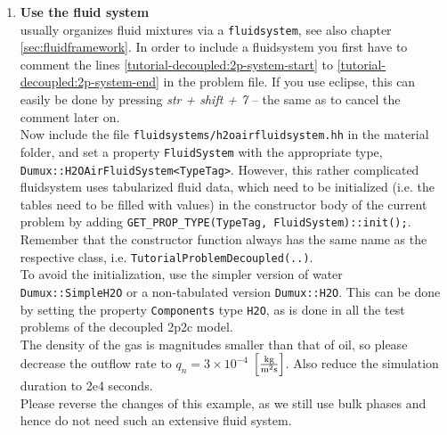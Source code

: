 \begin{enumerate}
\item \textbf{Use the \Dumux fluid system}\label{dec-ex1-fluidsystem} \\
\Dumux usually organizes fluid mixtures via a \texttt{fluidsystem}, see also chapter \ref{sec:fluidframework}. In order to include a fluidsystem you first have to comment the lines \ref{tutorial-decoupled:2p-system-start} to \ref{tutorial-decoupled:2p-system-end} in the problem file. If you use eclipse, this can easily be done by pressing \textit{str + shift + 7} -- the same as to cancel the comment later on.\\
Now include the file \texttt{fluidsystems/h2oairfluidsystem.hh} in the material folder, and set a property \texttt{FluidSystem} with the appropriate type, \texttt{Dumux::H2OAirFluidSystem<TypeTag>}. However, this rather complicated fluidsystem uses tabularized fluid data, which need to be initialized (i.e. the tables need to be filled with values) in the constructor body of the current problem by adding \texttt{GET\_PROP\_TYPE(TypeTag, FluidSystem)::init();}. Remember that the constructor function always has the same name as the respective class, i.e. \texttt{TutorialProblemDecoupled(..)}.\\
To avoid the initialization, use the simpler version of water \texttt{Dumux::SimpleH2O} or a non-tabulated version \texttt{Dumux::H2O}. This can be done by setting the property \texttt{Components} type \texttt{H2O},
as is done in all the test problems of the decoupled 2p2c model.\\
The density of the gas is magnitudes smaller than that of oil, so please decrease the outflow rate to $q_n = 3 \times 10^{-4}$ $\left[\frac{\textnormal{kg}}{\textnormal{m}^2 \textnormal{s}}\right]$. Also reduce the simulation duration to 2e4 seconds.\\
Please reverse the changes of this example, as we still use bulk phases and hence do not need such an extensive fluid system.
 

\end{enumerate}
